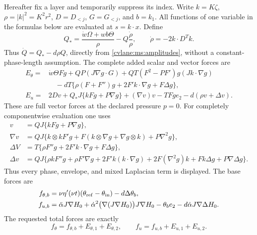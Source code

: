 Hereafter fix a layer and temporarily suppress its index. Write
$k=K\zeta$, $\rho=|k|^2=K^2r^2$, $D=D_{<j}$, $G=G_{<j}$,
and $b=k_1$. All functions of one variable in the formulas below
are evaluated at $s=k\cdot x$. Define
\begin{equation}\label{cvlane:ms:Qrest}
 Q_* =\frac{\dot w\Omega+wb\Theta}{\rho}
                         -Q\frac{\dot\rho}{\rho},
 \qquad\dot\rho=-2k\cdot D^Tk.
\end{equation}
Thus $\dot Q=Q_*-d\rho Q$, directly from
\eqref{cvlane:ms:amplitudes}, without a constant-phase-length assumption.
The complete added scalar and vector forces are
\begin{align}
 E_\theta={}&\dot w\Theta Fg+QP(J\nabla g\cdot G)
       +QT(F^2-PF')g(Jk\cdot\nabla g)\nonumber\\
 &\quad-dT\{\rho(F+F'')g+2F'k\cdot\nabla g+F\Delta g\},
 \label{cvlane:ms:scalar}\\
 E_u={}&2Dv+Q_*J\{kFg+P\nabla g\}
                         +(\nabla v)v-TFg e_2
                         -d(\rho v+\Delta v).
 \label{cvlane:ms:vector}
\end{align}
These are full vector forces at the declared pressure $p=0$.
For completely componentwise evaluation one uses
\begin{align}
 v&=QJ\{kFg+P\nabla g\},\nonumber\\
 \nabla v&=QJ\{k\otimes k F'g+
           F(k\otimes\nabla g+\nabla g\otimes k)+P\nabla^2g\},
 \label{cvlane:ms:velocityjets}\\
 \Delta V&=T\{\rho F''g+2F'k\cdot\nabla g+F\Delta g\},
 \label{cvlane:ms:lapscalar}\\
 \Delta v&=QJ\{\rho kF''g+\rho F'\nabla g
       +2F'k(k\cdot\nabla g)+2F(\nabla^2g)k
                         +Fk\Delta g+P\nabla\Delta g\}.
 \label{cvlane:ms:lapvector}
\end{align}
Thus every phase, envelope, and mixed Laplacian term is displayed.
The base forces are
\begin{align}
 f_{\theta,b}&=\nu\eta'(\nu t)
                 (\theta_{\rm ref}-\theta_{\rm in})-d\Delta\theta_b,
 \nonumber\\
 f_{u,b}&=\ddot\alpha J\nabla H_0+
        \dot\alpha^2\bigl(\nabla(J\nabla H_0)\bigr)J\nabla H_0
                          -\theta_b e_2-d\dot\alpha J\nabla\Delta H_0.
 \label{cvlane:ms:baseforce}
\end{align}
The requested total forces are exactly
\begin{equation}\label{cvlane:ms:totalforce}
 f_\theta=f_{\theta,b}+E_{\theta,1}+E_{\theta,2},
 \qquad f_u=f_{u,b}+E_{u,1}+E_{u,2}.
\end{equation}


